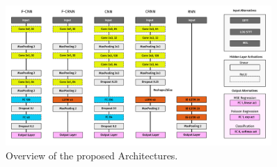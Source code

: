 %
%
%
\begin{figure}[tb]
\centering
\includegraphics[width=0.9\textwidth]{Chapters/08_Analysis_CountNet/dsc/figures/networkoverview.pdf}
\caption{Overview of the proposed Architectures.}%
\label{fig:networkoverview}%
\end{figure}

